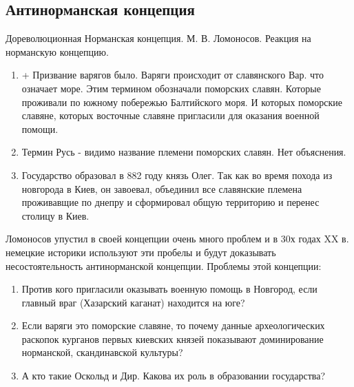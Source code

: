 \documentclass[a4paper]{article}
\begin{document}
\subsection{Антинорманская концепция}
Дореволюционная Норманская концепция. М. В. Ломоносов.
Реакция на норманскую концепцию. 
\begin{enumerate}
    \item + Призвание варягов было. Варяги происходит от славянского Вар. что означает море. Этим термином обозначали поморских славян. Которые проживали по южному побережью Балтийского моря. И которых поморские славяне, которых восточные славяне пригласили для оказания военной помощи. 
    \item Термин Русь - видимо название племени поморских славян. Нет объяснения. 
    \item Государство образовал в 882 году князь Олег. Так как во время похода из новгорода в Киев, он завоевал, объединил все славянские племена проживавщие по днепру и сформировал общую территорию и перенес столицу в Киев.
\end{enumerate}
Ломоносов упустил в своей концепции очень много проблем и в 30х годах XX в. немецкие историки используют эти пробелы и будут доказывать несостоятельность антинорманской концепции.
Проблемы этой концепции:
\begin{enumerate}
    \item Против кого пригласили оказывать военную помощь в Новгород, если главный враг (Хазарский каганат) находится на юге?
    \item Если варяги это поморские славяне, то почему данные археологических раскопок курганов первых киевских князей показывают доминирование норманской, скандинавской культуры?
    \item А кто такие Оскольд и Дир. Какова их роль в образовании государства?
\end{enumerate} 
\end{document}
